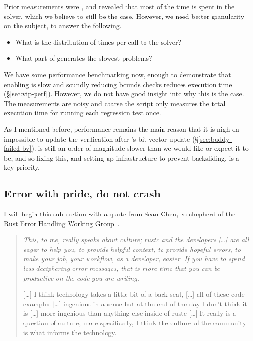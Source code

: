 Prior measurements were \adhoc{}, and revealed that most of the time is spent
in the solver, which we believe to still be the case. However, we need better
granularity on the subject, to answer the following.
\begin{itemize}
    \item What is the distribution of times per call to the solver?
    \item What part of  generates the slowest problems?
\end{itemize}

We have some performance benchmarking now, enough to demonstrate that enabling
 is slow and soundly reducing bounds checks reduces execution time (\S\ref{sec:vip-perf}). However, we
do not have good insight into why this is the case. The measurements
are noisy and coarse \textemdash{} the script only measures the total execution
time for running each regression test once.

As I mentioned before, performance remains the main reason that it is nigh-on
impossible to update the   verification after 's
bit-vector update (\S\ref{sec:buddy-failed-bv}).  is still an order of
magnitude slower than we would like or expect it to be, and so fixing this, and
setting up infrastructure to prevent backsliding, is a key priority.

\subsection{Error with pride, do not crash}\label{sec:error-msgs}

I will begin this sub-section with a quote from Sean Chen, co-shepherd
of the Rust Error Handling Working Group~.

\begin{quote}
\em
This, to me, really speaks about culture; rustc and the developers [\ldots]
are all eager to help you, to provide helpful context,
to provide hopeful errors, to make your job, your workflow, as a developer,
easier. If you have to spend less deciphering error messages, that is more time
that you can be productive on the code you are writing.

[\ldots] I think technology takes a little bit of a back seat, [\ldots] all of
these code examples [\ldots] ingenious in a sense but at the end
of the day I don't think it is [\ldots] more ingenious than anything else
inside of rustc [\ldots] It really is a question of culture, more specifically,
I think the culture of the community is what informs the technology.
\end{quote}

